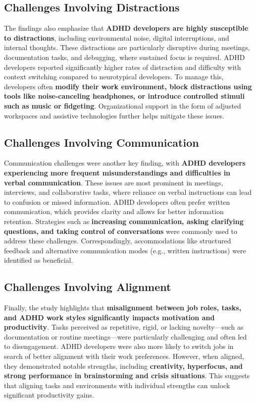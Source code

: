 \subsection{Challenges Involving Distractions}
The findings also emphasize that \textbf{ADHD developers are highly susceptible to distractions}, including environmental noise, digital interruptions, and internal thoughts. These distractions are particularly disruptive during meetings, documentation tasks, and debugging, where sustained focus is required. ADHD developers reported significantly higher rates of distraction and difficulty with context switching compared to neurotypical developers. To manage this, developers often \textbf{modify their work environment, block distractions using tools like noise-canceling headphones, or introduce controlled stimuli such as music or fidgeting}. Organizational support in the form of adjusted workspaces and assistive technologies further helps mitigate these issues.

\subsection{Challenges Involving Communication}
Communication challenges were another key finding, with \textbf{ADHD developers experiencing more frequent misunderstandings and difficulties in verbal communication}. These issues are most prominent in meetings, interviews, and collaborative tasks, where reliance on verbal instructions can lead to confusion or missed information. ADHD developers often prefer written communication, which provides clarity and allows for better information retention. Strategies such as \textbf{increasing communication, asking clarifying questions, and taking control of conversations} were commonly used to address these challenges. Correspondingly, accommodations like structured feedback and alternative communication modes (e.g., written instructions) were identified as beneficial.

\subsection{Challenges Involving Alignment}
Finally, the study highlights that \textbf{misalignment between job roles, tasks, and ADHD work styles significantly impacts motivation and productivity}. Tasks perceived as repetitive, rigid, or lacking novelty—such as documentation or routine meetings—were particularly challenging and often led to disengagement. ADHD developers were also more likely to switch jobs in search of better alignment with their work preferences. However, when aligned, they demonstrated notable strengths, including \textbf{creativity, hyperfocus, and strong performance in brainstorming and crisis situations}. This suggests that aligning tasks and environments with individual strengths can unlock significant productivity gains.

